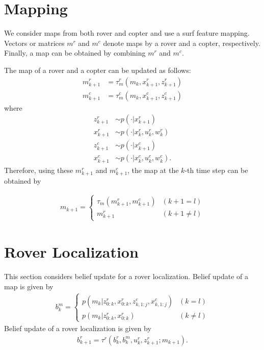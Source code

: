 \documentclass[conference]{IEEEtran}
\begin{document}
\section{Mapping}

We consider maps from both rover and copter and use a surf feature mapping. Vectors or matrices $m^r$ and $m^c$ denote maps by a rover and a copter, respectively. Finally, a map can be obtained by combining $m^r$ and $m^c$.

The map of a rover and a copter can be updated as follows:
\begin{align}
    m^r_{k+1}&=\tau^r_m (m_k, x^r_{k+1}, z^r_{k+1})\\
    m^c_{k+1}&=\tau^c_m (m_k, x^c_{k+1}, z^c_{k+1})
\end{align}
where
\begin{align}
    z^r_{k+1} &\sim p(\cdot |x^r_{k+1})\\
    x^r_{k+1} &\sim p(\cdot |x^r_k, u^r_k, w^r_k)\\
    z^c_{k+1} &\sim p(\cdot |x^c_{k+1})\\
    x^c_{k+1} &\sim p(\cdot |x^c_k, u^c_k, w^c_k).
\end{align}
Therefore, using these $m^r_{k+1}$ and $m^c_{k+1}$, the map at the $k$-th time step can be obtained by

\begin{eqnarray}
m_{k+1} =
  \begin{cases}
    \tau_m (m^r_{k+1}, m^c_{k+1}) & (k+1 = l)\\
    m^r_{k+1} & (k+1 \neq l)
  \end{cases}
\end{eqnarray}

\section{Rover Localization}
This section considers belief update for a rover localization. Belief update of a map is given by
\begin{eqnarray}
    b^{m}_k=
    \begin{cases}
    p(m_k | z^r_{0:k}, x^r_{0:k}, z^c_{k,1:j}, x^c_{k,1:j}) & (k=l)\\
    p(m_k | z^r_{0:k}, x^r_{0:k}) & (k \neq l)
    \end{cases}
\end{eqnarray}
Belief update of a rover localization is given by
\begin{align}
    b^r_{k+1}=\tau^r (b^r_k, b^m_k, u^r_k, z^r_{k+1}; m_{k+1}).
\end{align}
\end{document}
